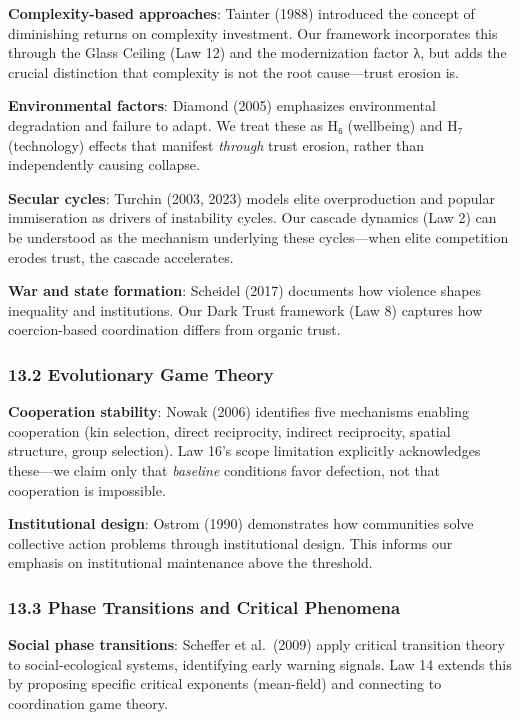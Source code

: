 \documentclass[11pt,letterpaper]{article}
\begin{document}
\textbf{Complexity-based approaches}: Tainter (1988) introduced the
concept of diminishing returns on complexity investment. Our framework
incorporates this through the Glass Ceiling (Law 12) and the
modernization factor λ, but adds the crucial distinction that complexity
is not the root cause---trust erosion is.

\textbf{Environmental factors}: Diamond (2005) emphasizes environmental
degradation and failure to adapt. We treat these as H₆ (wellbeing) and
H₇ (technology) effects that manifest \emph{through} trust erosion,
rather than independently causing collapse.

\textbf{Secular cycles}: Turchin (2003, 2023) models elite
overproduction and popular immiseration as drivers of instability
cycles. Our cascade dynamics (Law 2) can be understood as the mechanism
underlying these cycles---when elite competition erodes trust, the
cascade accelerates.

\textbf{War and state formation}: Scheidel (2017) documents how violence
shapes inequality and institutions. Our Dark Trust framework (Law 8)
captures how coercion-based coordination differs from organic trust.

\subsubsection{13.2 Evolutionary Game
Theory}\label{evolutionary-game-theory}

\textbf{Cooperation stability}: Nowak (2006) identifies five mechanisms
enabling cooperation (kin selection, direct reciprocity, indirect
reciprocity, spatial structure, group selection). Law 16's scope
limitation explicitly acknowledges these---we claim only that
\emph{baseline} conditions favor defection, not that cooperation is
impossible.

\textbf{Institutional design}: Ostrom (1990) demonstrates how
communities solve collective action problems through institutional
design. This informs our emphasis on institutional maintenance above the
threshold.

\subsubsection{13.3 Phase Transitions and Critical
Phenomena}\label{phase-transitions-and-critical-phenomena}

\textbf{Social phase transitions}: Scheffer et al.~(2009) apply critical
transition theory to social-ecological systems, identifying early
warning signals. Law 14 extends this by proposing specific critical
exponents (mean-field) and connecting to coordination game theory.
\end{document}

